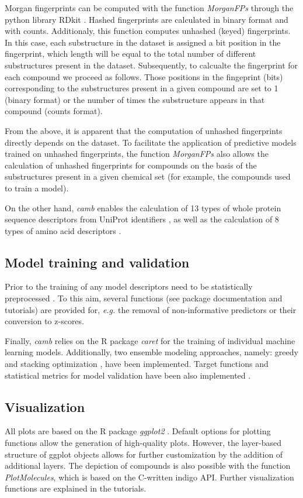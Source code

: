 \documentclass{bioinfo}
\begin{document}
Morgan fingerprints can be computed with the function {\it MorganFPs}
through the python library RDkit \citep{rdkit}.
Hashed fingerprints are calculated in binary format and with counts.
Additionaly, this function computes unhashed (keyed) fingerprints.
In this case, each substructure in the dataset is assigned a bit position in the fingerprint,
which length will be equal to the total number of different substructures present in the dataset.
Subsequently, to calcualte the fingerprint for each compound we proceed as follows.
Those positions in the fingeprint (bits) corresponding to the substructures 
present in a given compound are set to 1 (binary format)
or the number of times the substructure appears in that compound (counts format).

From the above, it is apparent that the computation of unhashed fingerprints
directly depends on the dataset.
To facilitate the application of predictive models trained on unhashed fingerprints,
the function {\it MorganFPs} also allows the calculation of unhashed fingerprints for compounds
on the basis of the substructures present in a given chemical set (for example, the compounds
used to train a model).

On the other hand, {\it camb} enables the calculation of 13 types of whole protein sequence descriptors
from UniProt identifiers \citep{protr},
as well as the calculation of 8 types of amino acid descriptors \citep{AA_benchmark}.

\subsection{Model training and validation}

Prior to the training of any model descriptors need to be statistically preprocessed \citep{andersson}.
To this aim, several functions (see package documentation and tutorials)
are provided for, {\it e.g.} the removal of non-informative predictors or
their conversion to z-scores.

Finally, {\it camb} relies on the R package {\it caret} for the 
training of individual machine learning models.
Additionally, two ensemble modeling approaches, namely: greedy and stacking optimization \citep{cortesCOX},
have been implemented.
Target functions and statistical metrics for model validation have been also implemented \citep{beware}.

\subsection{Visualization}
All plots are based on the R package {\it ggplot2} \citep{ggplot2}.
Default options for plotting functions allow the generation of 
high-quality plots.
However, the layer-based structure of ggplot objects allows for further customization
by the addition of additional layers.  %
The depiction of compounds is also possible with the function {\it PlotMolecules},
which is based on the C-written indigo API.
Further visualization functions are explained in the tutorials.
\end{document}
